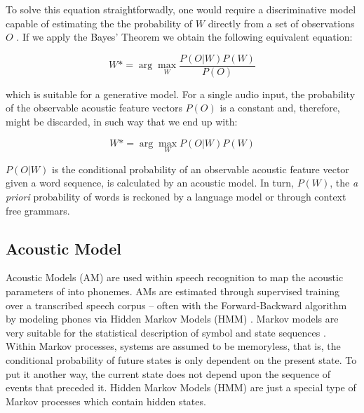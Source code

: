 \documentclass[twocolumn]{bmcart}%
\begin{document}
To solve this equation straightforwadly, one would require a discriminative model
capable of estimating the the probability of $W$ directly from a set of observations $O$ \cite{Gales2008}.
If we apply the Bayes' Theorem we obtain the following equivalent equation:

\begin{equation}
W*= \arg\max_{W}\frac{P(O|W)P(W)}{P(O)}
\end{equation}

which is suitable for a generative model. For a single audio input, the probability of the observable acoustic feature vectors $P(O)$ is a constant and, therefore, might be discarded, in such way that we end up with:

\begin{equation}
W*= \arg\max_{W}P(O|W)P(W)
\end{equation}

$P(O|W)$ is the conditional probability of an observable acoustic feature vector given a word sequence, is calculated by an acoustic model. In turn, $P(W)$, the \emph{a priori} probability of words is reckoned by a language model or through context free grammars.

\subsection*{\textbf{Acoustic Model}}

Acoustic Models (AM) are used within speech recognition to map the acoustic parameters of into phonemes.  AMs are estimated through supervised training over a transcribed speech corpus -- often with the Forward-Backward algorithm by modeling phones via Hidden Markov Models (HMM) \cite{Rabiner1989}. Markov models are very suitable for the statistical description of symbol and state sequences \cite{Fink2014}. Within Markov processes, systems are assumed to be memoryless, that is, the conditional probability of future states is only dependent on the present state. To put it another way, the current state does not depend upon the 
sequence of events that preceded it. Hidden Markov Models (HMM) are just a special type of Markov processes which contain hidden states.
\end{document}
